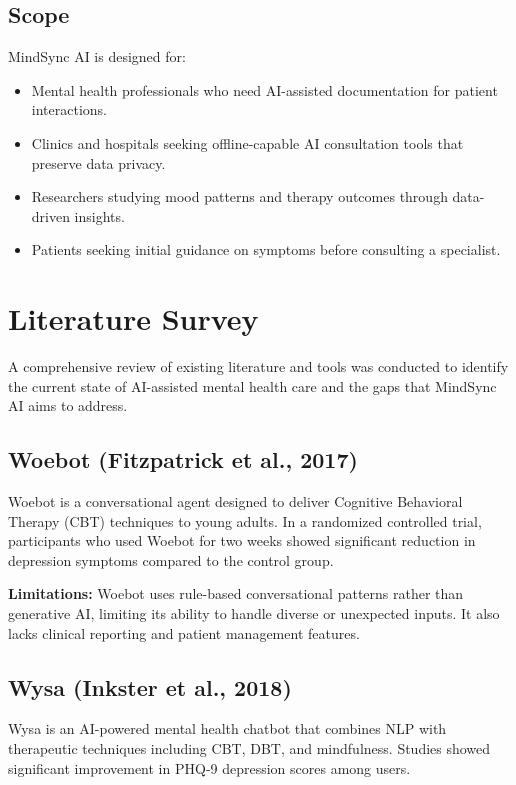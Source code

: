 \documentclass[12pt,a4paper]{report}
\begin{document}
\section{Scope}

MindSync AI is designed for:

\begin{itemize}
    \item Mental health professionals who need AI-assisted documentation for patient interactions.
    \item Clinics and hospitals seeking offline-capable AI consultation tools that preserve data privacy.
    \item Researchers studying mood patterns and therapy outcomes through data-driven insights.
    \item Patients seeking initial guidance on symptoms before consulting a specialist.
\end{itemize}

\chapter{Literature Survey}

A comprehensive review of existing literature and tools was conducted to identify the current state of AI-assisted mental health care and the gaps that MindSync AI aims to address.

\section{Woebot (Fitzpatrick et al., 2017)}

Woebot is a conversational agent designed to deliver Cognitive Behavioral Therapy (CBT) techniques to young adults. In a randomized controlled trial, participants who used Woebot for two weeks showed significant reduction in depression symptoms compared to the control group.

\textbf{Limitations:} Woebot uses rule-based conversational patterns rather than generative AI, limiting its ability to handle diverse or unexpected inputs. It also lacks clinical reporting and patient management features.

\section{Wysa (Inkster et al., 2018)}

Wysa is an AI-powered mental health chatbot that combines NLP with therapeutic techniques including CBT, DBT, and mindfulness. Studies showed significant improvement in PHQ-9 depression scores among users.
\end{document}
